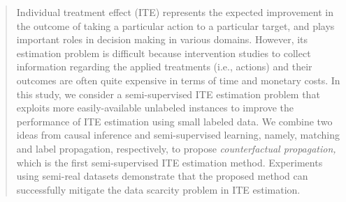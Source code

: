 \documentclass[runningheads]{llncs}
\begin{document}
%
\maketitle              %
%
\begin{abstract}
Individual treatment effect (ITE) represents the expected improvement in the outcome of taking a particular action to a particular target, and plays important roles in decision making in various domains.
However, its estimation problem is difficult because intervention studies to collect information regarding the applied treatments (i.e., actions) and their outcomes are often quite expensive in terms of time and monetary costs. 
In this study, we consider a semi-supervised ITE estimation problem that exploits more easily-available unlabeled instances to improve the performance of ITE estimation using small labeled data.
We combine two ideas from causal inference and semi-supervised learning, namely, matching and label propagation, respectively, to propose {\it counterfactual propagation,} which is the first semi-supervised ITE estimation method. 
Experiments using semi-real datasets demonstrate that the proposed method can successfully mitigate the data scarcity problem in ITE estimation.

\end{abstract}






%
%
%
% 
% 



\end{document}
